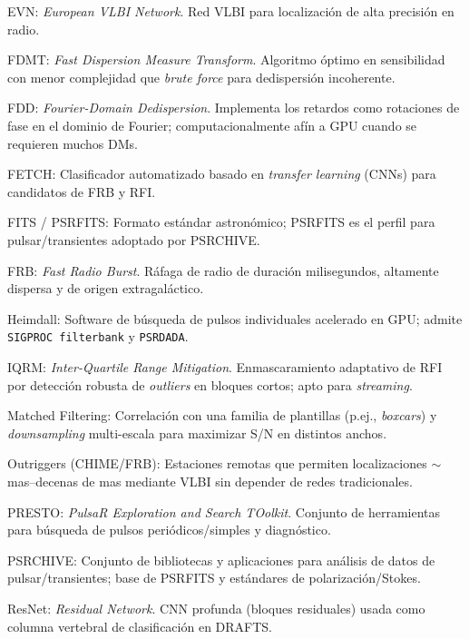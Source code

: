 {EVN: \textit{European VLBI Network}. Red VLBI para localización de alta precisión en radio.

FDMT: \textit{Fast Dispersion Measure Transform}. Algoritmo óptimo en sensibilidad con menor complejidad que \textit{brute force} para dedispersión incoherente. \citep{Zackay_2014_FDMT}

FDD: \textit{Fourier-Domain Dedispersion}. Implementa los retardos como rotaciones de fase en el dominio de Fourier; computacionalmente afín a GPU cuando se requieren muchos DMs. \citep{Bassa_2021_FDD}

FETCH: Clasificador automatizado basado en \textit{transfer learning} (CNNs) para candidatos de FRB y RFI. \citep{Agarwal_2020}

FITS / PSRFITS: Formato estándar astronómico; PSRFITS es el perfil para pulsar/transientes adoptado por \textsc{PSRCHIVE}. \citep{Hotan_2004_PSRFITS}

FRB: \textit{Fast Radio Burst}. Ráfaga de radio de duración milisegundos, altamente dispersa y de origen extragaláctico. \citep{Petroff_2022,Zhang_2020}

Heimdall: Software de búsqueda de pulsos individuales acelerado en GPU; admite \texttt{SIGPROC filterbank} y \texttt{PSRDADA}. \citep{Heimdall_Use}

IQRM: \textit{Inter-Quartile Range Mitigation}. Enmascaramiento adaptativo de RFI por detección robusta de \textit{outliers} en bloques cortos; apto para \textit{streaming}. \citep{Morello_2021_IQRM}

Matched Filtering: Correlación con una familia de plantillas (p.ej., \textit{boxcars}) y \textit{downsampling} multi-escala para maximizar S/N en distintos anchos. \citep{Rajwade_2024_Review}

Outriggers (CHIME/FRB): Estaciones remotas que permiten localizaciones $\sim$mas–decenas de mas mediante VLBI sin depender de redes tradicionales. \citep{Lanman_2024_Outrigger,CHIME_Outriggers_Overview}

PRESTO: \textit{PulsaR Exploration and Search TOolkit}. Conjunto de herramientas para búsqueda de pulsos periódicos/simples y diagnóstico. \citep{Ransom_PRESTO_Tutorial}

PSRCHIVE: Conjunto de bibliotecas y aplicaciones para análisis de datos de pulsar/transientes; base de PSRFITS y estándares de polarización/Stokes. \citep{Hotan_2004_PSRFITS}

ResNet: \textit{Residual Network}. CNN profunda (bloques residuales) usada como columna vertebral de clasificación en DRAFTS. \citep{He_2015_ResNet}

}
